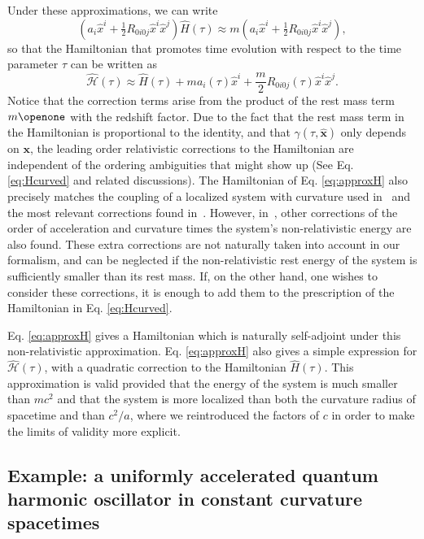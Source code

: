 \documentclass[prd,twocolumn,superscriptaddress,floatfix,amsmath,amssymb,amsfonts,longbibliography,nofootinbib]{revtex4-1}
\begin{document}
Under these approximations, we can write
\begin{equation}
    \left(a_i \hat{x}^i + \tfrac{1}{2} R_{0i0j}\hat{x}^i\hat{x}^j\right)\!\hat{H}(\tau)\approx m\!\left(a_i \hat{x}^i + \tfrac{1}{2} R_{0i0j}\hat{x}^i\hat{x}^j\right),
\end{equation}
so that the Hamiltonian that promotes time evolution with respect to the time parameter $\tau$ can be written as
\begin{equation}\label{eq:approxH}
    \hat{\mathcal{H}}(\tau)\approx \hat{H}(\tau)+m  a_i(\tau) \hat{x}^i + \frac{m}{2}R_{0i0j}(\tau)\hat{x}^i \hat{x}^j.
\end{equation}
Notice that the correction terms arise from the product of the rest mass term $m\openone$ with the redshift factor. Due to the fact that the rest mass term in the Hamiltonian is proportional to the identity, and that $\gamma(\tau,\hat{\bm x})$ only depends on $\bm x$, the leading order relativistic corrections to the Hamiltonian are independent of the ordering ambiguities that might show up (See Eq. \eqref{eq:Hcurved} and related discussions). The Hamiltonian of Eq. \eqref{eq:approxH} also precisely matches the coupling of a localized system with curvature used in~\cite{gravDetec,pitelli} and the most relevant corrections found in~\cite{jonas}. However, in~\cite{jonas}, other corrections of the order of acceleration and curvature times the system's non-relativistic energy are also found. These extra corrections are not naturally taken into account in our formalism, and can be neglected if the non-relativistic rest energy of the system is sufficiently smaller than its rest mass. If, on the other hand, one wishes to consider these corrections, it is enough to add them to the prescription of the Hamiltonian in Eq. \eqref{eq:Hcurved}.

Eq. \eqref{eq:approxH} gives a Hamiltonian which is naturally self-adjoint under this non-relativistic approximation. Eq. \eqref{eq:approxH} also gives a simple expression for $\hat{\mathcal{H}}(\tau)$, with a quadratic correction to the Hamiltonian $\hat{H}(\tau)$. This approximation is valid provided that the energy of the system is much smaller than $mc^2$ and that the system is more localized than both the curvature radius of spacetime and than $c^2/a$, where we reintroduced the factors of $c$ in order to make the limits of validity more explicit.

\subsection{Example: a uniformly accelerated quantum harmonic oscillator in constant curvature spacetimes}\label{sub:example}
\end{document}
